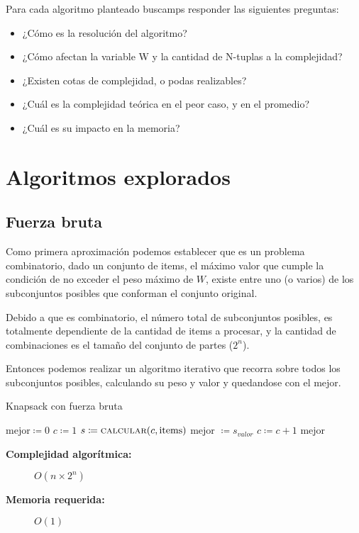\documentclass[fleqn, 11pt]{article}
\def\is{\coloneqq}
\begin{document}
Para cada algoritmo planteado buscamps responder las siguientes preguntas:

\begin{itemize}
\item[] ¿Cómo es la resolución del algoritmo?
\item[] ¿Cómo afectan la variable W y la cantidad de N-tuplas a la complejidad?
\item[] ¿Existen cotas de complejidad, o podas realizables?
\item[] ¿Cuál es la complejidad teórica en el peor caso, y en el promedio?
\item[] ¿Cuál es su impacto en la memoria?
\end{itemize}

\section{Algoritmos explorados}

\subsection{Fuerza bruta}

Como primera aproximación podemos establecer que es un problema combinatorio,
dado un conjunto de items, el máximo valor que cumple la condición de no
exceder el peso máximo de $W$, existe entre uno (o varios) de los subconjuntos
posibles que conforman el conjunto original.

Debido a que es combinatorio, el número total de subconjuntos posibles, es
totalmente dependiente de la cantidad de items a procesar, y la cantidad de
combinaciones es el tamaño del conjunto de partes ($2^n$).

Entonces podemos realizar un algoritmo iterativo que recorra sobre todos los
subconjuntos posibles, calculando su peso y valor y quedandose con el mejor.

\begin{algorithm}
\caption{Knapsack con fuerza bruta}
\begin{algorithmic}[1]
\Statex
{}
\State $\text{mejor} \is 0$
\State $c \is 1$
	\State $s \is \Call{calcular}{c, \text{items}}$
		\State mejor $\is s_{valor}$
	\EndIf
	\State $c \is c + 1$
\EndWhile
\State \Return mejor
\EndFunction
\end{algorithmic}
\begin{description}
	\item[\textbf{Complejidad algorítmica:}] $O(n \times 2^n)$
	\item[\textbf{Memoria requerida:}] $O(1)$
\end{description}
\end{algorithm}
\end{document}
